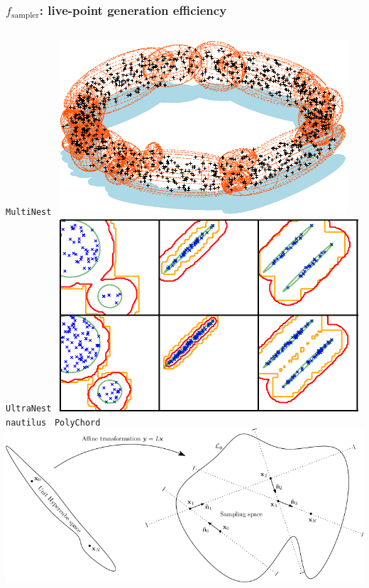 \documentclass[aspectratio=169]{beamer}
\begin{document}
\begin{frame}
    \frametitle{$f_\text{sampler}$: live-point generation efficiency}
    \begin{columns}[t]
        \texttt{MultiNest}~
        \includegraphics[width=\textwidth]{figures/multinest}
        \texttt{UltraNest}~
        \includegraphics[width=\textwidth]{figures/radfriends}
        \texttt{nautilus}~ 
        \texttt{PolyChord}~
        \includegraphics[width=\textwidth]{figures/polychord}

\end{columns}
\end{frame}
\end{document}
